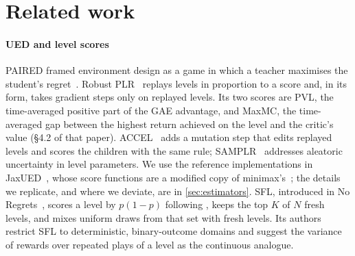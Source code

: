 \section{Related work}
\label{sec:related}

\paragraph{UED and level scores} PAIRED framed environment design as a game in which a
teacher maximises the student's regret~\citep{dennis2020paired}. Robust PLR~\citep{jiang2021robustplr} replays
levels in proportion to a score and, in its \PLRp{} form, takes gradient steps only on
replayed levels. Its two scores are PVL, the time-averaged positive part of the GAE
advantage, and MaxMC, the time-averaged gap between the highest return achieved on the
level and the critic's value (\S4.2 of that paper).
ACCEL~\citep{parkerholder2022accel} adds a mutation step that edits replayed levels and
scores the children with the same rule; SAMPLR~\citep{jiang2022samplr} addresses
aleatoric uncertainty in level parameters. We use the reference implementations in JaxUED~\citep{coward2024jaxued},
whose score functions are a modified copy of minimax's~\citep{minimax2023code}; the
details we replicate, and where we deviate, are in \cref{sec:estimators}. SFL, introduced
in No Regrets~\citep{rutherford2024noregrets}, scores a level by $p(1-p)$ following
\citet{tzannetos2023procurl}, keeps the top $K$ of $N$ fresh levels, and mixes uniform
draws from that set with fresh levels.
Its authors restrict SFL to deterministic, binary-outcome domains and suggest the
variance of rewards over repeated plays of a level as the continuous analogue.

